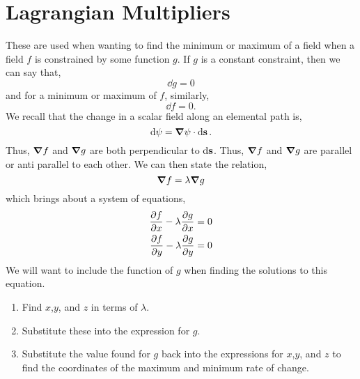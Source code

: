 \documentclass{book}
\begin{document}
\section{Lagrangian Multipliers}
These are used when wanting to find the minimum or maximum of a field when a field $f$ is constrained by some function $g$. If $g$ is a constant constraint, then we can say that,
\begin{equation}
    \dd{g} = 0
\end{equation}
and for a minimum or maximum of $f$, similarly,
\begin{equation}
    \dd{f} = 0.
\end{equation}
We recall that the change in a scalar field along an elemental path is,
\begin{equation}
    \dd{\psi} = \grad \psi \cdot \dd{\vb{s}}.
\end{equation}
Thus, $\grad f$ and $\grad g$ are both perpendicular to $\dd{\vb{s}}$. Thus, $\grad f$ and $\grad g$ are parallel or anti parallel to each other. We can then state the relation,
\begin{equation}
    \grad f = \lambda \grad g
\end{equation}
which brings about a system of equations,
\begin{equation}
    \begin{split}
        \pdv{f}{x} - \lambda \pdv{g}{x} & = 0 \\
        \pdv{f}{y} - \lambda \pdv{g}{y} & = 0
    \end{split}
\end{equation}
We will want to include the function of $g$ when finding the solutions to this equation. 
\begin{enumerate}
    \item Find $x$,$y$, and $z$ in terms of $\lambda$.
    \item Substitute these into the expression for $g$.
    \item Substitute the value found for $g$ back into the expressions for $x$,$y$, and $z$ to find the coordinates of the maximum and minimum rate of change.
\end{enumerate}
\end{document}
